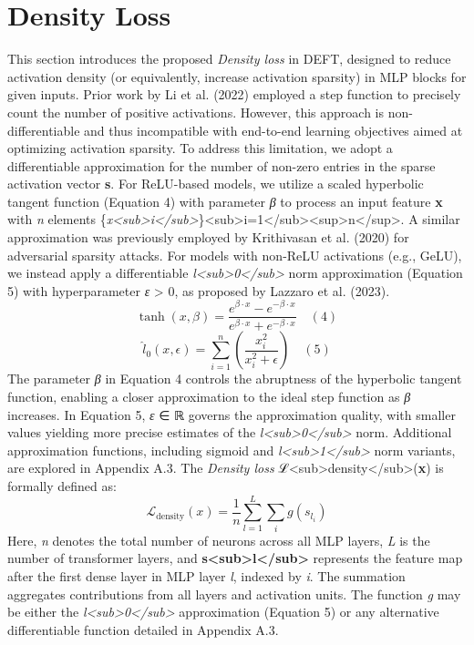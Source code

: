\documentclass[10pt,twocolumn]{article}
\begin{document}
\section{Density Loss}

This section introduces the proposed \textit{Density loss} in DEFT, designed to reduce activation density (or equivalently, increase activation sparsity) in MLP blocks for given inputs. Prior work by Li et al. (2022) employed a step function to precisely count the number of positive activations. However, this approach is non-differentiable and thus incompatible with end-to-end learning objectives aimed at optimizing activation sparsity. To address this limitation, we adopt a differentiable approximation for the number of non-zero entries in the sparse activation vector \textbf{s}. For ReLU-based models, we utilize a scaled hyperbolic tangent function (Equation 4) with parameter \textit{β} to process an input feature \textbf{x} with \textit{n} elements \{\textit{x\textless{}sub\textgreater{}i\textless{}/sub\textgreater{}}\}\textless{}sub\textgreater{}i=1\textless{}/sub\textgreater{}\textless{}sup\textgreater{}n\textless{}/sup\textgreater{}. A similar approximation was previously employed by Krithivasan et al. (2020) for adversarial sparsity attacks. For models with non-ReLU activations (e.g., GeLU), we instead apply a differentiable \textit{l\textless{}sub\textgreater{}0\textless{}/sub\textgreater{}} norm approximation (Equation 5) with hyperparameter \textit{ε} \textgreater{} 0, as proposed by Lazzaro et al. (2023).
\[\tanh(x,\beta)=\frac{e^{\beta\cdot x}-e^{-\beta\cdot x}}{e^{\beta\cdot x}+e^{-\beta\cdot x}} \quad (4)\]
\[\hat{l}_{0}(x,\epsilon)=\sum_{i=1}^{n}\left(\frac{x_{i}^{2}}{x_{i}^{2}+\epsilon}\right) \quad (5)\]
The parameter \textit{β} in Equation 4 controls the abruptness of the hyperbolic tangent function, enabling a closer approximation to the ideal step function as \textit{β} increases. In Equation 5, \textit{ε} ∈ ℝ governs the approximation quality, with smaller values yielding more precise estimates of the \textit{l\textless{}sub\textgreater{}0\textless{}/sub\textgreater{}} norm. Additional approximation functions, including sigmoid and \textit{l\textless{}sub\textgreater{}1\textless{}/sub\textgreater{}} norm variants, are explored in Appendix A.3. The \textit{Density loss} ℒ\textless{}sub\textgreater{}density\textless{}/sub\textgreater{}(\textbf{x}) is formally defined as:
\[\mathcal{L}_{\mathrm{density}}(x)=\frac{1}{n}\sum_{l=1}^{L}\sum_{i}g(s_{l_{i}})\]
Here, \textit{n} denotes the total number of neurons across all MLP layers, \textit{L} is the number of transformer layers, and \textbf{s\textless{}sub\textgreater{}l\textless{}/sub\textgreater{}} represents the feature map after the first dense layer in MLP layer \textit{l}, indexed by \textit{i}. The summation aggregates contributions from all layers and activation units. The function \textit{g} may be either the \textit{l\textless{}sub\textgreater{}0\textless{}/sub\textgreater{}} approximation (Equation 5) or any alternative differentiable function detailed in Appendix A.3.
\end{document}
